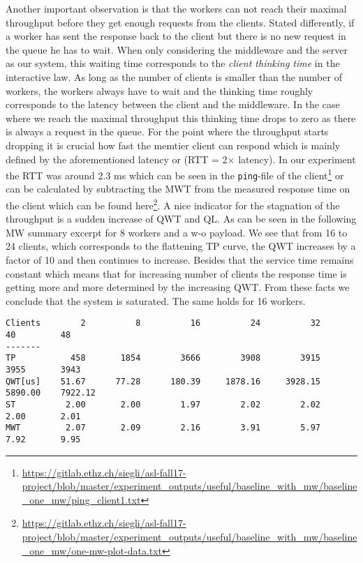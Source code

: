 \documentclass[11pt,a4paper]{article}
\makeatletter
\newcommand{\verbatimfont}[1]{\renewcommand{\verbatim@font}{\ttfamily#1}}
\let\ti\textit
\let\tt\texttt
\makeatother
\begin{document}
Another important observation is that the workers can not reach their maximal throughput before they get enough requests from the clients. Stated differently, if a worker has sent the response back to the client but there is no new request in the queue he has to wait. When only considering the middleware and the server as our system, this waiting time corresponds to the \ti{client thinking time} in the interactive law. As long as the number of clients is smaller than the number of workers, the workers always have to wait and the thinking time roughly corresponds to the latency between the client and the middleware. In the case where we reach the maximal throughput this thinking time drops to zero as there is always a request in the queue. For the point where the throughput starts dropping it is crucial how fast the memtier client can respond which is mainly defined by the aforementioned latency or (RTT = 2$\times$ latency). In our experiment the RTT was around 2.3 ms which can be seen in the \tt{ping}-file of the client\footnote{\url{https://gitlab.ethz.ch/siegli/asl-fall17-project/blob/master/experiment_outputs/useful/baseline_with_mw/baseline_one_mw/ping_client1.txt}} or can be calculated by subtracting the MWT from the measured response time on the client which can be found here\footnote{\url{https://gitlab.ethz.ch/siegli/asl-fall17-project/blob/master/experiment_outputs/useful/baseline_with_mw/baseline_one_mw/one-mw-plot-data.txt}}. A nice indicator for the stagnation of the throughput is a sudden increase of QWT and QL. As can be seen in the following MW summary excerpt for 8 workers and a w-o payload. We see that from 16 to 24 clients, which corresponds to the flattening TP curve, the QWT increases by a factor of 10 and then continues to increase. Besides that the service time remains constant which means that for increasing number of clients the response time is getting more and more determined by the increasing QWT. From these facts we conclude that the system is saturated. The same holds for 16 workers. 
\verbatimfont{\small}%
\begin{verbatim}
Clients        2          8          16          24          32          40         48          
-------
TP           458       1854        3666        3908        3915        3955       3943   
QWT[us]    51.67      77.28      180.39     1878.16     3928.15     5890.00    7922.12
ST          2.00       2.00        1.97        2.02        2.02        2.00       2.01
MWT         2.07       2.09        2.16        3.91        5.97        7.92       9.95
\end{verbatim}
\end{document}

